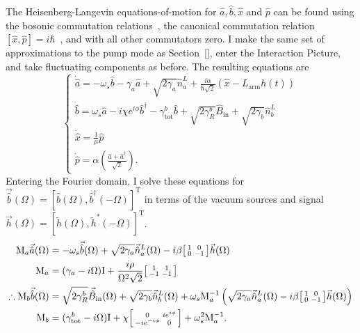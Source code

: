 The Heisenberg-Langevin equations-of-motion for $\hat a, \hat b, \hat x$ and $\hat p$ can be found using the bosonic commutation relations~\cite{}, the canonical commutation relation $[\hat x,\hat p]=i\hbar$~\cite{}, and with all other commutators zero. I make the same set of approximations to the pump mode as Section~\ref{}, enter the Interaction Picture, and take fluctuating components as before. The resulting equations are
\begin{equation}\begin{cases}
\dot{\hat a}=-\omega_s \hat b- \gamma_a \hat{a} + \sqrt{2\gamma_a}\hat{n}^L_a+\frac{i \alpha}{\hbar\sqrt2}(\hat{x}-L_\mathrm{arm}h(t)) \\
\dot{\hat b}=\omega_s \hat a-i\chi e^{i\phi} \hat b^\dag - \gamma^b_\mathrm{tot} \hat{b} + \sqrt{2\gamma^b_R}\hat{B}_\mathrm{in} + \sqrt{2\gamma_b}\hat{n}^L_b\\
\dot{\hat x}=\frac{1}{\mu}\hat p\\
\dot{\hat p}=\alpha(\frac{\hat{a}+\hat{a}^\dag}{\sqrt{2}}).
\end{cases}\end{equation}
Entering the Fourier domain, I solve these equations for $\vec{\hat b}(\Omega)=[\hat b(\Omega),\hat b^\dag(-\Omega)]^\text{T}$ in terms of the vacuum sources and signal $\vec h(\Omega)=[\tilde h(\Omega),\tilde h^*(-\Omega)]^\text{T}$.
\begin{align}
\text{M}_a\vec{\hat a}(\Omega)&=-\omega_s\vec{\hat b}(\Omega) + \sqrt{2\gamma_a}\vec{\hat n}^L_a(\Omega)-i\beta\begin{bsmallmatrix}1 & 0 \\0 & -1\end{bsmallmatrix}\vec h(\Omega) \\
\text{M}_a&= (\gamma_a-i \Omega)\text{I}+\frac{i \rho}{\Omega^2 \sqrt 2}\begin{bsmallmatrix}1 & 1 \\-1 & -1\end{bsmallmatrix} \\
\therefore\text{M}_b\vec{\hat b}(\Omega)&=\sqrt{2\gamma^b_R}\vec{\hat B}_\mathrm{in}(\Omega) + \sqrt{2\gamma_b}\vec{\hat n}^L_b(\Omega)+\omega_s \text{M}_a^{-1}\left(\sqrt{2\gamma_a}\vec{\hat n}^L_a(\Omega)-i\beta\begin{bsmallmatrix}1 & 0 \\0 & -1\end{bsmallmatrix}\vec h(\Omega)\right)\\
\text{M}_b&= (\gamma^b_\mathrm{tot}-i \Omega)\text{I}+\chi \begin{bsmallmatrix}0 & i e^{i\phi}\\-i e^{-i\phi} & 0\end{bsmallmatrix}+\omega_s^2\text{M}_a^{-1}.
\end{align}
